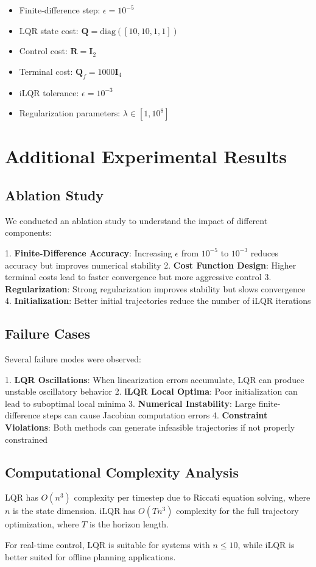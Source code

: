 \documentclass[conference]{IEEEtran}
\begin{document}
\begin{itemize}
\item Finite-difference step: $\epsilon = 10^{-5}$
\item LQR state cost: $\mathbf{Q} = \text{diag}([10, 10, 1, 1])$
\item Control cost: $\mathbf{R} = \mathbf{I}_2$
\item Terminal cost: $\mathbf{Q}_f = 1000\mathbf{I}_4$
\item iLQR tolerance: $\epsilon = 10^{-3}$
\item Regularization parameters: $\lambda \in [1, 10^8]$
\end{itemize}

\section{Additional Experimental Results}

\subsection{Ablation Study}

We conducted an ablation study to understand the impact of different components:

1. \textbf{Finite-Difference Accuracy}: Increasing $\epsilon$ from $10^{-5}$ to $10^{-3}$ reduces accuracy but improves numerical stability
2. \textbf{Cost Function Design}: Higher terminal costs lead to faster convergence but more aggressive control
3. \textbf{Regularization}: Strong regularization improves stability but slows convergence
4. \textbf{Initialization}: Better initial trajectories reduce the number of iLQR iterations

\subsection{Failure Cases}

Several failure modes were observed:

1. \textbf{LQR Oscillations}: When linearization errors accumulate, LQR can produce unstable oscillatory behavior
2. \textbf{iLQR Local Optima}: Poor initialization can lead to suboptimal local minima
3. \textbf{Numerical Instability}: Large finite-difference steps can cause Jacobian computation errors
4. \textbf{Constraint Violations}: Both methods can generate infeasible trajectories if not properly constrained

\subsection{Computational Complexity Analysis}

LQR has $O(n^3)$ complexity per timestep due to Riccati equation solving, where $n$ is the state dimension. iLQR has $O(T n^3)$ complexity for the full trajectory optimization, where $T$ is the horizon length.

For real-time control, LQR is suitable for systems with $n \leq 10$, while iLQR is better suited for offline planning applications.
\end{document}

